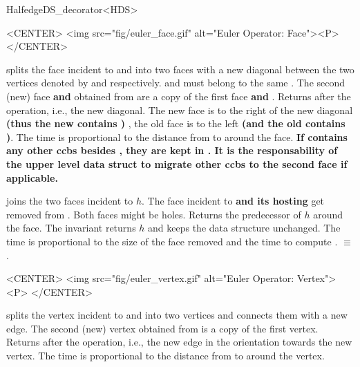 \begin{ccRefClass}{HalfedgeDS_decorator<HDS>}
\begin{ccHtmlOnly}
    <CENTER>
    <img src="fig/euler_face.gif" alt="Euler Operator: Face"><P>
    </CENTER>
\end{ccHtmlOnly}

    {splits the face incident to  and  into two faces
     with a new diagonal between the two vertices denoted by  and
      respectively.  and  must belong to the same .
     The second (new) face {\bf\ttfamily and }
     obtained from  are a copy of the first face {\bf\ttfamily and }.
     Returns  after the operation, i.e., the new diagonal.
     The new face is to the right of the new diagonal
     {\bf\ttfamily (thus the new  contains )}
     , the old face is to the left 
     {\bf\ttfamily (and the old  contains )}.
     The time is proportional 
     to the distance from  to  around the face.
     {\bf\ttfamily If  contains any other ccbs besides ,
     they are kept in . It is the responsability of the upper level 
     data struct to migrate other ccbs to the second face if applicable.}
    } 

    {joins the two faces incident to $h$. The face incident to
      {\bf\ttfamily and its hosting }
     get removed from .
    Both faces might be holes. Returns the predecessor of $h$ around the face. The invariant
     returns $h$ and keeps
    the data structure unchanged. The time is proportional to the size
    of the face removed and the time to compute .
      $\equiv$
    .
    }


\begin{ccHtmlOnly}
    <CENTER>
    <img src="fig/euler_vertex.gif" alt="Euler Operator: Vertex"><P>
    </CENTER>
\end{ccHtmlOnly}

    {splits the vertex incident to  and  into two vertices
     and connects them with a new edge. The second (new) vertex
     obtained from  is a copy of the first vertex. Returns
      after the operation, i.e., the new edge
     in the orientation towards the new vertex. The time is proportional 
     to the distance from  to  around the vertex.} 


\end{ccRefClass}
